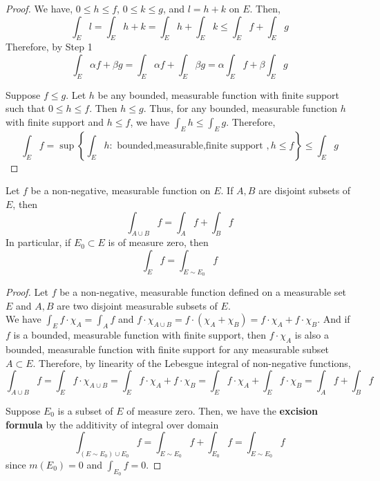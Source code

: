 \begin{proof}
	We have, $0 \le h \le f$, $0 \le k \le g$, and $ l = h+k$ on $E$.
	Then,
	\begin{equation}
		\int_E l = \int_E h + k = \int_E h + \int_E k \le \int_E f + \int_E g
	\end{equation}
	Therefore, by Step 1
	$$\int_E \alpha f+ \beta g = \int_E \alpha f + \int_E \beta g = \alpha \int_E f + \beta \int_E g $$

	Suppose $f \le g$.
	Let $h$ be any bounded, measurable function with finite support such that $0 \le h \le f$.
	Then $h \le g$.
	Thus, for any bounded, measurable function $h$ with finite support and $h \le f$, we have $\displaystyle \int_E h \le \int_E g$.
	Therefore,
	$$ \int_E f = \sup \left\{ \int_E h : \text{ bounded,measurable,finite support },h \le f \right\} \le \int_E g $$
\end{proof}

\begin{theorem}
	Let $f$ be a non-negative, measurable function on $E$.
	If $A,B$ are disjoint subsets of $E$, then
	\begin{equation}
		\int_{A \cup B} f = \int_A f + \int_B f
	\end{equation}
	In particular, if $E_0 \subset E$ is of measure zero, then
	\begin{equation}
		\int_{E} f = \int_{E \sim E_0} f
	\end{equation}
\end{theorem}
\begin{proof}
	Let $f$ be a non-negative, measurable function defined on a measurable set $E$ and $A,B$ are two disjoint measurable subsets of $E$.\\

	We have $\displaystyle \int_E f \cdot \chi_A = \int_A f$ and $f \cdot \chi_{A \cup B} = f \cdot (\chi_{A} + \chi_B) = f \cdot \chi_A + f \cdot \chi_B$.
	And if $f$ is a bounded, measurable function with finite support, then $f \cdot \chi_A$ is also a bounded, measurable function with finite support for any measurable subset $A \subset E$.
	Therefore, by linearity of the Lebesgue integral of non-negative functions,
	$$ \int_{A \cup B} f = \int_E f \cdot \chi_{A \cup B} = \int_E f \cdot \chi_A + f \cdot \chi_B = \int_E f \cdot \chi_A + \int_E f \cdot \chi_B = \int_A f + \int_B f$$

	Suppose $E_0$ is a subset of $E$ of measure zero.
	Then, we have the \textbf{excision formula} by the additivity of integral over domain
	\begin{equation}
		\int_{(E \sim E_0) \cup E_0} f = \int_{E \sim E_0} f + \int_{E_0} f = \int_{E \sim E_0} f
	\end{equation}
	since $m(E_0) = 0$ and $\displaystyle \int_{E_0} f = 0$.
\end{proof}

